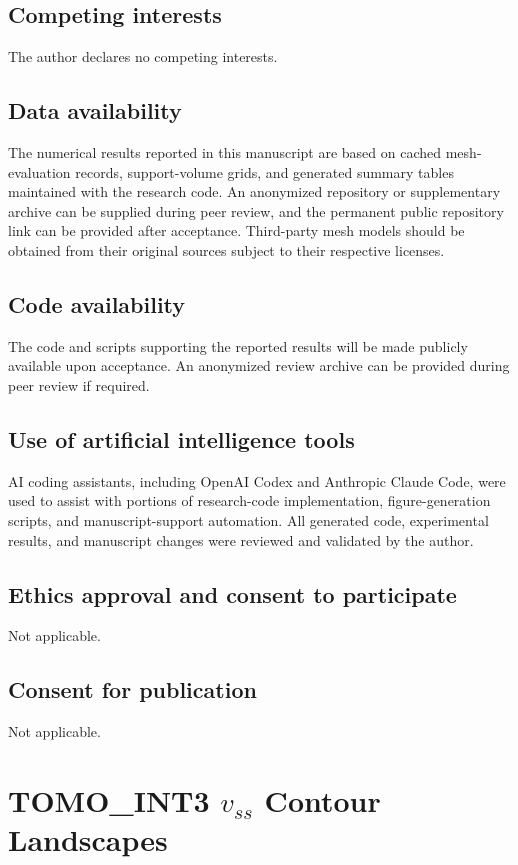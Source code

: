 \documentclass[11pt,a4paper]{article}
\begin{document}
\subsection*{Competing interests}
The author declares no competing interests.

\subsection*{Data availability}
The numerical results reported in this manuscript are based on cached mesh-evaluation records, support-volume grids, and generated summary tables maintained with the research code.
An anonymized repository or supplementary archive can be supplied during peer review, and the permanent public repository link can be provided after acceptance.
Third-party mesh models should be obtained from their original sources subject to their respective licenses.

\subsection*{Code availability}
The code and scripts supporting the reported results will be made publicly available upon acceptance.
An anonymized review archive can be provided during peer review if required.

\subsection*{Use of artificial intelligence tools}
AI coding assistants, including OpenAI Codex and Anthropic Claude Code, were used to assist with portions of research-code implementation, figure-generation scripts, and manuscript-support automation.
All generated code, experimental results, and manuscript changes were reviewed and validated by the author.

\subsection*{Ethics approval and consent to participate}
Not applicable.

\subsection*{Consent for publication}
Not applicable.

\appendix

\section{TOMO\_INT3 $v_{ss}$ Contour Landscapes}
\label{sec:appendix-landscape}
\end{document}
